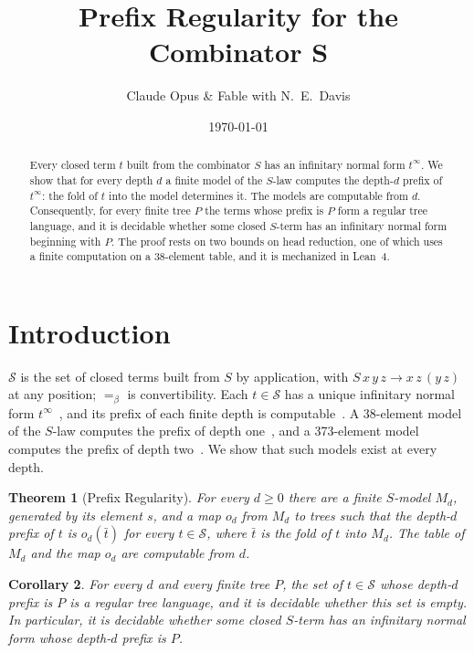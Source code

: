 \documentclass[11pt]{amsart}
\title{Prefix Regularity for the Combinator $\bm{S}$}
\author{Claude Opus \& Fable with N.\ E.\ Davis}
\date{\today}
\newtheorem{theorem}{Theorem}
\newtheorem{corollary}[theorem]{Corollary}
\theoremstyle{definition}
\newcommand{\Ter}{\mathcal S}
\newcommand{\conv}{=_\beta}
\begin{document}
\begin{abstract}
Every closed term $t$ built from the combinator $S$ has an infinitary normal form $t^\infty$. We show
that for every depth $d$ a finite model of the $S$-law computes the depth-$d$ prefix of $t^\infty$: the
fold of $t$ into the model determines it. The models are computable from $d$. Consequently, for every
finite tree $P$ the terms whose prefix is $P$ form a regular tree language, and it is decidable whether
some closed $S$-term has an infinitary normal form beginning with $P$. The proof rests on two
bounds on head reduction, one of which uses a finite computation on a 38-element table, and it is
mechanized in Lean~4.
\end{abstract}

\maketitle

\section{Introduction}

$\Ter$ is the set of closed terms built from $S$ by application, with $S\,x\,y\,z\to x\,z\,(y\,z)$ at
any position; $\conv$ is convertibility. Each $t\in\Ter$ has a unique infinitary normal form
$t^\infty$~\citep{waldmann-thesis,s3}, and its prefix of each finite depth is computable~\citep{s3}.
A 38-element model of the $S$-law computes the prefix of depth one~\citep{s1}, and a 373-element model
computes the prefix of depth two~\citep{s5}. We show that such models exist at every depth.

\begin{theorem}[Prefix Regularity]\label{thm:main}
For every $d\ge0$ there are a finite $S$-model $M_d$, generated by its element $s$, and a map $o_d$
from $M_d$ to trees such that the depth-$d$ prefix of $t$ is $o_d(\bar t)$ for every $t\in\Ter$, where
$\bar t$ is the fold of $t$ into $M_d$. The table of $M_d$ and the map $o_d$ are computable from $d$.
\end{theorem}

\begin{corollary}\label{cor:realize}
For every $d$ and every finite tree $P$, the set of $t\in\Ter$ whose depth-$d$ prefix is $P$ is a
regular tree language, and it is decidable whether this set is empty. In particular, it is
decidable whether some closed $S$-term has an infinitary normal form whose depth-$d$ prefix is $P$.
\end{corollary}
\end{document}
